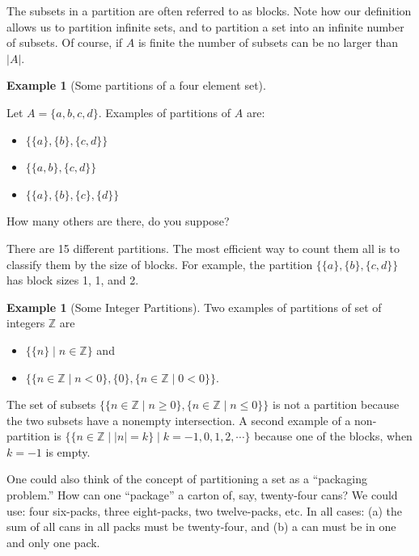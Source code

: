 \documentclass[10pt,]{book}
\theoremstyle{plain}
\theoremstyle{definition}
\newtheorem{example}[theorem]{Example}
\begin{document}
 The subsets in a partition are often referred to as blocks. Note how our definition allows us to partition infinite sets, and to partition a set into an infinite number of subsets. Of course, if \(A\)  is finite the number of subsets can be no larger than \(\lvert A \rvert \).
%
\begin{example}[Some partitions of a four element set]\label{some-partitions-4}

  Let \(A = \{a, b, c, d\}\). Examples of partitions of \(A\)  are:
\leavevmode%
\begin{itemize}[label=\textbullet]
\item{} \(\{\{a\}, \{b\}, \{c, d\}\}\)\item{} \(\{\{a, b\}, \{c, d\}\}\)\item{} \(\{\{a\}, \{b\}, \{c\}, \{d\}\}\)\end{itemize}
How many others are there, do you suppose?
%
\par
There are 15 different partitions.  The most efficient way to count them all is to classify them by the size of blocks.   For example, the partition \(\{\{a\}, \{b\}, \{c, d\}\}\) has block sizes 1, 1, and 2.
%
\end{example}
\begin{example}[Some Integer Partitions]\label{some-integer-partitions}
Two examples of partitions of set of integers \(\mathbb{Z}\) are 
\leavevmode%
\begin{itemize}[label=\textbullet]
\item{}\(\{\{n\} \mid n \in \mathbb{Z}\}\) and\item{} \(\{\{ n \in \mathbb{Z} \mid n < 0\}, \{0\},\{ n \in \mathbb{Z} \mid 0 < 0 \}\}\).\end{itemize}
%
\par
 The set of subsets \(\{\{n \in \mathbb{Z} \mid n \geq 0\},\{n \in \mathbb{Z} \mid  n \leq 0\}\}\) is not a partition because the two subsets have a nonempty intersection. A second example of a non-partition is 
\(\{\{n \in \mathbb{Z} \mid  \lvert n \rvert = k\} \mid k = -1, 0, 1, 2, \cdots\}\) because one of the blocks, when \(k=-1\) is empty.%
\end{example}
\par
One could also think of the concept of partitioning a set as a ``packaging problem.'' How can one ``package'' a carton of, say, twenty-four cans? We could use: four six-packs, three eight-packs, two twelve-packs, etc. In all cases: (a) the sum of all cans in all packs must be twenty-four, and (b) a can must be in one and only one pack.
%
\typeout{************************************************}
\typeout{************************************************}
\end{document}
